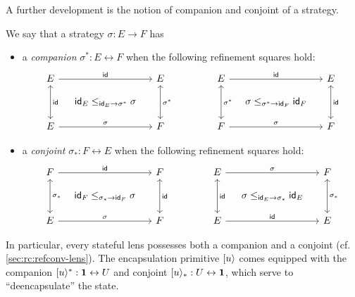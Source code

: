 A further development is
the notion of companion and conjoint of a strategy.
\begin{definition}
  We say that a strategy $\sigma : E \rightarrow F$ has
  \begin{itemize}
    \item a \emph{companion} $\sigma^* : E \leftrightarrow F$
      when the following refinement squares hold:
      \[
        \begin{tikzcd}[sep=small]
          E \ar[rr, "\kw{id}"] \ar[dd, leftrightarrow, "\kw{id}"] && E \ar[dd, leftrightarrow, "\sigma^*"] \\
          & \kw{id}_E \le_{\kw{id}_E \rightarrow \sigma^*} \sigma &
          \\
          E \ar[rr, "\sigma"] && F
        \end{tikzcd}
        \qquad\qquad
        \begin{tikzcd}[sep=small]
          E \ar[rr, "\kw{id}"] \ar[dd, leftrightarrow, "\sigma^*"] && E \ar[dd, leftrightarrow, "\kw{id}"] \\
          & \sigma \le_{\sigma^* \rightarrow \kw{id}_F} \kw{id}_F &
          \\
          F \ar[rr, "\sigma"] && F
        \end{tikzcd}
      \]
    \item a \emph{conjoint} $\sigma_* : F \leftrightarrow E$
      when the following refinement squares hold:
      \[
        \begin{tikzcd}[sep=small]
          F \ar[rr, "\kw{id}"] \ar[dd, leftrightarrow, "\sigma_*"] && F \ar[dd, leftrightarrow, "\kw{id}"] \\
          & \kw{id}_F \le_{\sigma_* \rightarrow \kw{id}_F} \sigma &
          \\
          E \ar[rr, "\sigma"] && F
        \end{tikzcd}
        \qquad\qquad
        \begin{tikzcd}[sep=small]
          E \ar[rr, "\sigma"] \ar[dd, leftrightarrow, "\kw{id}"] && F \ar[dd, leftrightarrow, "\sigma_*"] \\
          & \sigma \le_{\kw{id}_E \rightarrow \sigma_*} \kw{id}_E &
          \\
          E \ar[rr, "\kw{id}"] && E
        \end{tikzcd}
      \]
  \end{itemize}
\end{definition}
In particular,
every stateful lens possesses both a companion and a conjoint
(cf. \autoref{sec:rc:refconv-lens}).
The encapsulation primitive $[ {u} \rangle$
comes equipped with the
companion $[ {u} \rangle^* : \mathbf{1} \leftrightarrow U$
and conjoint $[ {u} \rangle_* : U \leftrightarrow \mathbf{1}$,
which serve to ``deencapsulate'' the state.

